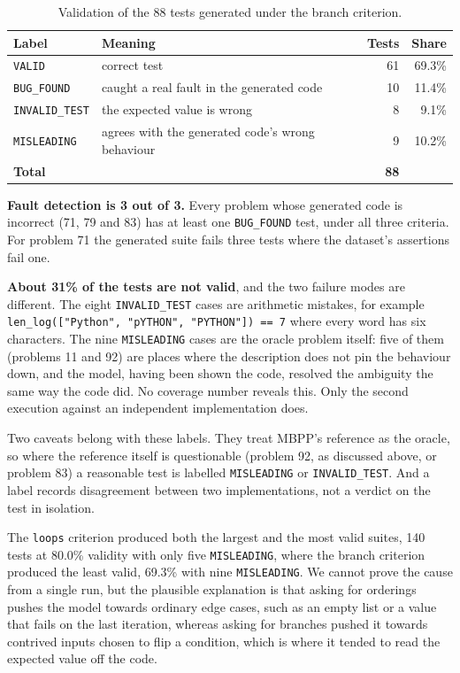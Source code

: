\documentclass[11pt,a4paper]{article}
\begin{document}
\begin{table}[htbp]
\centering
\small
\caption{Validation of the 88 tests generated under the branch criterion.}
\label{tab:labelsresults}
\begin{tabular}{@{}llrr@{}}
\toprule
\textbf{Label} & \textbf{Meaning} & \textbf{Tests} & \textbf{Share} \\
\midrule
\texttt{VALID} & correct test & 61 & 69.3\% \\
\texttt{BUG\_FOUND} & caught a real fault in the generated code & 10 & 11.4\% \\
\texttt{INVALID\_TEST} & the expected value is wrong & 8 & 9.1\% \\
\texttt{MISLEADING} & agrees with the generated code's wrong behaviour & 9 & 10.2\% \\
\midrule
\textbf{Total} & & \textbf{88} & \\
\bottomrule
\end{tabular}
\end{table}

\textbf{Fault detection is 3 out of 3.} Every problem whose generated code is incorrect (71, 79 and 83) has at
least one \texttt{BUG\_FOUND} test, under all three criteria. For problem 71 the generated suite fails three
tests where the dataset's assertions fail one.

\textbf{About 31\% of the tests are not valid}, and the two failure modes are different. The eight
\texttt{INVALID\_TEST} cases are arithmetic mistakes, for example
\texttt{len\_log(["Python", "pYTHON", "PYTHON"]) == 7} where every word has six characters. The nine
\texttt{MISLEADING} cases are the oracle problem itself: five of them (problems 11 and 92) are places where the
description does not pin the behaviour down, and the model, having been shown the code, resolved the ambiguity
the same way the code did. No coverage number reveals this. Only the second execution against an independent
implementation does.

Two caveats belong with these labels. They treat MBPP's reference as the oracle, so where the reference itself
is questionable (problem 92, as discussed above, or problem 83) a reasonable test is labelled
\texttt{MISLEADING} or \texttt{INVALID\_TEST}. And a label records disagreement between two implementations,
not a verdict on the test in isolation.

The \texttt{loops} criterion produced both the largest and the most valid suites, 140 tests at 80.0\% validity
with only five \texttt{MISLEADING}, where the branch criterion produced the least valid, 69.3\% with nine
\texttt{MISLEADING}. We cannot prove the cause from a single run, but the plausible explanation is that asking
for orderings pushes the model towards ordinary edge cases, such as an empty list or a value that fails on the
last iteration, whereas asking for branches pushed it towards contrived inputs chosen to flip a condition,
which is where it tended to read the expected value off the code.
\end{document}
